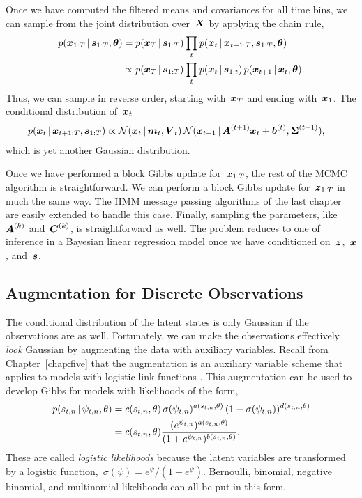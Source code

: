 Once we have computed the filtered means and covariances for all
time bins, we can sample from the joint distribution over~$\boldsymbol{X}$
by applying the chain rule,
\begin{align*}
  p(\boldsymbol{x}_{1:T} \,|\, \boldsymbol{s}_{1:T}, \boldsymbol{\theta})
  &= p(\boldsymbol{x}_T \,|\, \boldsymbol{s}_{1:T})
  \prod_{t} p(\boldsymbol{x}_{t} \,|\, \boldsymbol{x}_{t+1:T}, \boldsymbol{s}_{1:T}, \boldsymbol{\theta}) \\
  &\propto p(\boldsymbol{x}_T \,|\, \boldsymbol{s}_{1:T})
  \prod_{t} p(\boldsymbol{x}_t \,|\, \boldsymbol{s}_{1:t}) \, p(\boldsymbol{x}_{t+1} \,|\, \boldsymbol{x}_{t}, \boldsymbol{\theta}).
\end{align*}
Thus, we can sample in reverse order, starting with~$\boldsymbol{x}_T$ and ending
with~$\boldsymbol{x}_1$. The conditional distribution of~${\boldsymbol{x}_t}$
\begin{align*}
  p(\boldsymbol{x}_t \,|\, \boldsymbol{x}_{t+1:T}, \boldsymbol{s}_{1:T})
  &\propto
  \mathcal{N}(\boldsymbol{x}_t \,|\, \boldsymbol{m}_t, \boldsymbol{V}_t) \,
  \mathcal{N}(\boldsymbol{x}_{t+1} \,|\, \boldsymbol{A}^{(t+1)}\boldsymbol{x}_{t} + \boldsymbol{b}^{(t)}, \boldsymbol{\Sigma}^{(t+1)}),
\end{align*}
which is yet another Gaussian distribution.

Once we have performed a block Gibbs update for~$\boldsymbol{x}_{1:T}$, the rest
of the MCMC algorithm is straightforward. We can perform a block Gibbs
update for~$\boldsymbol{z}_{1:T}$ in much the same way. The HMM message passing
algorithms of the last chapter are easily extended to handle this
case. Finally, sampling the parameters, like~$\boldsymbol{A}^{(k)}$
and~$\boldsymbol{C}^{(k)}$, is straightforward as well.  The problem reduces to
one of inference in a Bayesian linear regression model once we
have conditioned on~$\boldsymbol{z}$,~$\boldsymbol{x}$, and~$\boldsymbol{s}$.

\subsection{\polyagamma Augmentation for Discrete Observations}
The conditional distribution of the latent states is only Gaussian
if the observations are as well. Fortunately, we can make the
observations effectively \emph{look} Gaussian by augmenting the
data with \polyagamma auxiliary variables. 
Recall from Chapter~\ref{chap:five} that the \polyagamma augmentation
is an auxiliary variable scheme that applies to models with logistic
link functions \citep{polson2013bayesian}.  This augmentation can be
used to develop Gibbs for models with likelihoods of the form,
\begin{align*}
  \nonumber  p(s_{t,n} \,|\, \psi_{t,n}, \theta)
  &= c(s_{t,n}, \theta) \, \sigma(\psi_{t,n})^{a(s_{t,n}, \theta)} \,
  (1-\sigma(\psi_{t,n}))^{d(s_{t,n}, \theta)} \\
  &= c(s_{t,n}, \theta)
  \frac{(e^{\psi_{t,n}})^{a(s_{t,n}, \theta)}}
       {(1+e^{\psi_{t,n}})^{b(s_{t,n}, \theta)}}.
\end{align*}
These are called \emph{logistic likelihoods} because the latent
variables are transformed by a logistic
function,~${\sigma(\psi)=e^\psi /(1+e^\psi)}$.  Bernoulli, binomial,
negative binomial, and multinomial likelihoods can all be put in this form.

